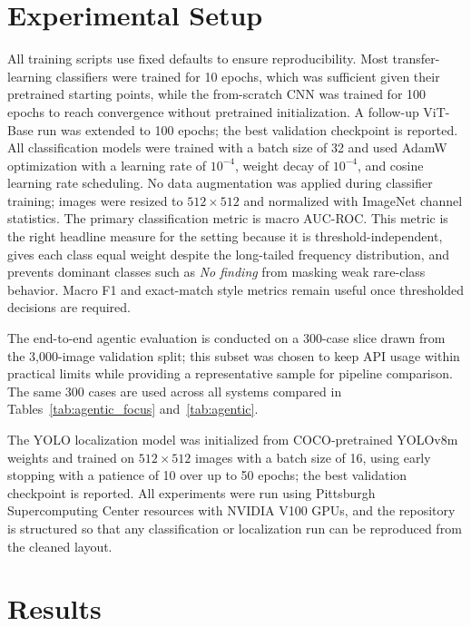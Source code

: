\documentclass[conference]{IEEEtran}
\begin{document}
\section{Experimental Setup}
All training scripts use fixed defaults to ensure reproducibility. Most transfer-learning classifiers were trained for 10 epochs, which was sufficient given their pretrained starting points, while the from-scratch CNN was trained for 100 epochs to reach convergence without pretrained initialization. A follow-up ViT-Base run was extended to 100 epochs; the best validation checkpoint is reported. All classification models were trained with a batch size of 32 and used AdamW optimization with a learning rate of $10^{-4}$, weight decay of $10^{-4}$, and cosine learning rate scheduling. No data augmentation was applied during classifier training; images were resized to $512\times512$ and normalized with ImageNet channel statistics. The primary classification metric is macro AUC-ROC. This metric is the right headline measure for the setting because it is threshold-independent, gives each class equal weight despite the long-tailed frequency distribution, and prevents dominant classes such as \textit{No finding} from masking weak rare-class behavior. Macro F1 and exact-match style metrics remain useful once thresholded decisions are required.

The end-to-end agentic evaluation is conducted on a 300-case slice drawn from the 3,000-image validation split; this subset was chosen to keep API usage within practical limits while providing a representative sample for pipeline comparison. The same 300 cases are used across all systems compared in Tables~\ref{tab:agentic_focus} and~\ref{tab:agentic}.

The YOLO localization model was initialized from COCO-pretrained YOLOv8m weights and trained on $512\times512$ images with a batch size of 16, using early stopping with a patience of 10 over up to 50 epochs; the best validation checkpoint is reported. All experiments were run using Pittsburgh Supercomputing Center resources with NVIDIA V100 GPUs, and the repository is structured so that any classification or localization run can be reproduced from the cleaned layout.

\section{Results}
\end{document}
